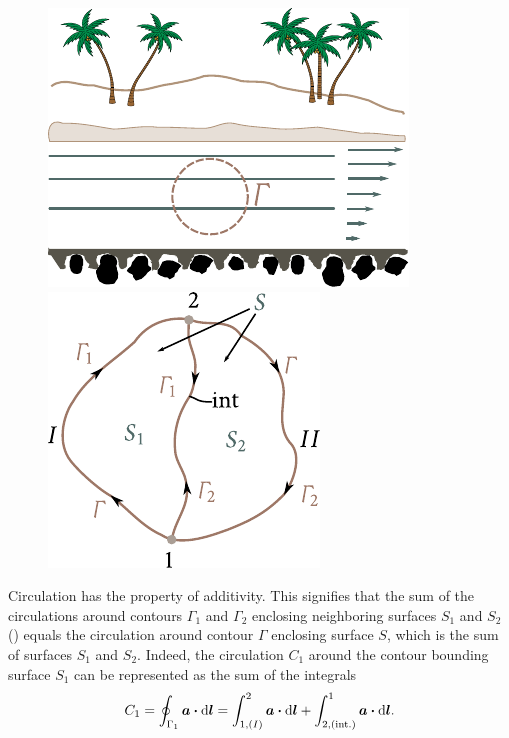 \begin{figure}[t]
	\begin{minipage}[t]{0.5\linewidth}
		\begin{center}
			\includegraphics[scale=0.95]{figures/ch_01/fig_1_27.pdf}
			\caption[]{}
			\label{fig:1_27}
		\end{center}
	\end{minipage}
	\hspace{-0.05cm}
	\begin{minipage}[t]{0.5\linewidth}
		\begin{center}
			\includegraphics[scale=0.95]{figures/ch_01/fig_1_28.pdf}
			\caption[]{}
			\label{fig:1_28}
		\end{center}
	\end{minipage}
\vspace{-0.65cm}
\end{figure}

Circulation has the property of additivity. This signifies that the sum of the circulations around contours $\Gamma_1$ and $\Gamma_2$ enclosing neighboring surfaces $S_1$ and $S_2$ () equals the circulation around contour $\Gamma$ enclosing surface $S$, which is the sum of surfaces $S_1$ and $S_2$. Indeed, the circulation $C_1$ around the contour bounding surface $S_1$ can be represented as the sum of the integrals
\begin{equation}\label{eq:1_84}
	C_1 = \oint_{\Gamma_1} \boldsymbol{a} \boldsymbol{\cdot} \mathrm{d}\boldsymbol{l} = \int_{1,(I)}^2 \boldsymbol{a} \boldsymbol{\cdot} \mathrm{d}\boldsymbol{l} + \int_{2,(\text{int.})}^1 \boldsymbol{a} \boldsymbol{\cdot} \mathrm{d}\boldsymbol{l}.
\end{equation}

